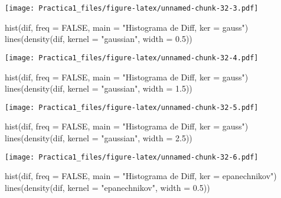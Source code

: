 \documentclass[
]{article}
\newenvironment{Shaded}{\begin{snugshade}}{\end{snugshade}}
\newcommand{\AttributeTok}[1]{\textcolor[rgb]{0.77,0.63,0.00}{#1}}
\newcommand{\ConstantTok}[1]{\textcolor[rgb]{0.00,0.00,0.00}{#1}}
\newcommand{\FloatTok}[1]{\textcolor[rgb]{0.00,0.00,0.81}{#1}}
\newcommand{\FunctionTok}[1]{\textcolor[rgb]{0.00,0.00,0.00}{#1}}
\newcommand{\NormalTok}[1]{#1}
\newcommand{\StringTok}[1]{\textcolor[rgb]{0.31,0.60,0.02}{#1}}
\begin{document}
\texttt{[image: Practica1\_files/figure-latex/unnamed-chunk-32-3.pdf]}

\begin{Shaded}
\begin{Highlighting}[]
\FunctionTok{hist}\NormalTok{(dif, }\AttributeTok{freq =} \ConstantTok{FALSE}\NormalTok{, }\AttributeTok{main =} \StringTok{"Histograma de Diff, ker = gauss"}\NormalTok{)}
\FunctionTok{lines}\NormalTok{(}\FunctionTok{density}\NormalTok{(dif, }\AttributeTok{kernel =} \StringTok{"gaussian"}\NormalTok{, }\AttributeTok{width =} \FloatTok{0.5}\NormalTok{))}
\end{Highlighting}
\end{Shaded}

\texttt{[image: Practica1\_files/figure-latex/unnamed-chunk-32-4.pdf]}

\begin{Shaded}
\begin{Highlighting}[]
\FunctionTok{hist}\NormalTok{(dif, }\AttributeTok{freq =} \ConstantTok{FALSE}\NormalTok{, }\AttributeTok{main =} \StringTok{"Histograma de Diff, ker = gauss"}\NormalTok{)}
\FunctionTok{lines}\NormalTok{(}\FunctionTok{density}\NormalTok{(dif, }\AttributeTok{kernel =} \StringTok{"gaussian"}\NormalTok{, }\AttributeTok{width =} \FloatTok{1.5}\NormalTok{))}
\end{Highlighting}
\end{Shaded}

\texttt{[image: Practica1\_files/figure-latex/unnamed-chunk-32-5.pdf]}

\begin{Shaded}
\begin{Highlighting}[]
\FunctionTok{hist}\NormalTok{(dif, }\AttributeTok{freq =} \ConstantTok{FALSE}\NormalTok{, }\AttributeTok{main =} \StringTok{"Histograma de Diff, ker = gauss"}\NormalTok{)}
\FunctionTok{lines}\NormalTok{(}\FunctionTok{density}\NormalTok{(dif, }\AttributeTok{kernel =} \StringTok{"gaussian"}\NormalTok{, }\AttributeTok{width =} \FloatTok{2.5}\NormalTok{))}
\end{Highlighting}
\end{Shaded}

\texttt{[image: Practica1\_files/figure-latex/unnamed-chunk-32-6.pdf]}

\begin{Shaded}
\begin{Highlighting}[]
\FunctionTok{hist}\NormalTok{(dif, }\AttributeTok{freq =} \ConstantTok{FALSE}\NormalTok{, }\AttributeTok{main =} \StringTok{"Histograma de Diff, ker = epanechnikov"}\NormalTok{)}
\FunctionTok{lines}\NormalTok{(}\FunctionTok{density}\NormalTok{(dif, }\AttributeTok{kernel =} \StringTok{"epanechnikov"}\NormalTok{, }\AttributeTok{width =} \FloatTok{0.5}\NormalTok{))}
\end{Highlighting}
\end{Shaded}
\end{document}
